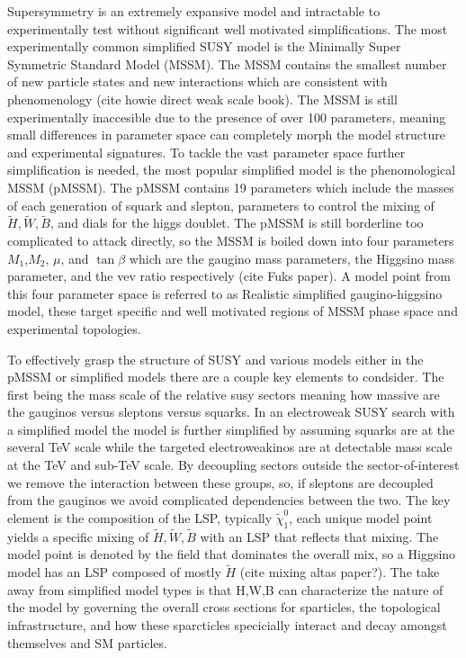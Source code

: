 


Supersymmetry is an extremely expansive model and intractable to experimentally test without significant well motivated simplifications. The most experimentally common simplified SUSY model is the Minimally Super Symmetric Standard Model (MSSM). The MSSM contains the smallest number of new particle states and new interactions which are consistent with phenomenology (cite howie direct weak scale book). The MSSM is still experimentally inaccesible due to the presence of over 100 parameters, meaning small differences in parameter space can completely morph the model structure and experimental signatures. To tackle the vast parameter space further simplification is needed, the most popular simplified model is the phenomological MSSM (pMSSM). The pMSSM contains 19 parameters which include the masses of each generation of squark and slepton, parameters to control the mixing of $\tilde{H}, \tilde{W}, \tilde{B}$, and dials for the higgs doublet.  The pMSSM is still borderline too complicated to attack directly, so the MSSM is boiled down into four parameters $M_1$,$M_2$, $\mu$, and $\tan\beta$ which are the gaugino mass parameters, the Higgsino mass parameter, and the vev ratio respectively (cite Fuks paper).  A model point from this four parameter space is referred to as Realistic simplified gaugino-higgsino model, these target specific and well motivated regions of MSSM phase space and experimental topologies.

To effectively grasp the structure of SUSY and various models either in the pMSSM or simplified models there are a couple key elements to condsider. The first being the mass scale of the relative susy sectors meaning how massive are the gauginos versus sleptons versus squarks. In an electroweak SUSY search with a simplified model the model is further simplified by assuming squarks are at the several TeV scale while the targeted electroweakinos are at detectable mass scale at the TeV and sub-TeV scale.  By decoupling sectors outside the sector-of-interest we remove the interaction between these groups, so, if sleptons are decoupled from the gauginos we avoid complicated dependencies between the two. The key element is the composition of the LSP, typically $\tilde{\chi}^0_1$, each unique model point yields a specific mixing of $\tilde{H},\tilde{W},\tilde{B}$ with an LSP that reflects that mixing. The model point is denoted by the field that dominates the overall mix, so a Higgsino model has an LSP composed of mostly $\tilde{H}$ (cite mixing altas paper?). The take away from simplified model types is that H,W,B  can characterize the nature of the model by governing the overall cross sections for sparticles, the topological infrastructure, and how these sparcticles specicially interact and decay amongst themselves and SM particles. 

